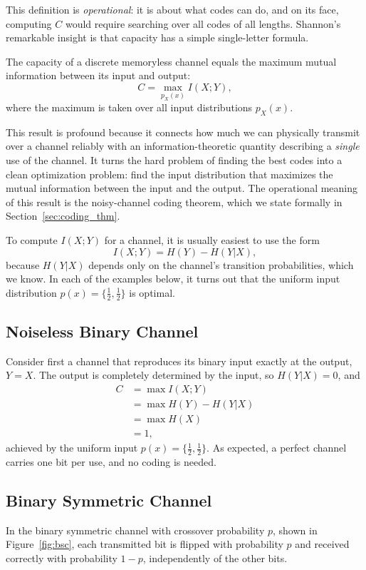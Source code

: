 This definition is \emph{operational}: it is about what codes can do, and on its face, computing \(C\) would require searching over all codes of all lengths. Shannon's remarkable insight is that capacity has a simple single-letter formula.

\begin{theorem}[Shannon]\label{thm:capacity_formula}
The capacity of a discrete memoryless channel equals the maximum mutual information between its input and output:
\[C = \max_{p_{X}(x)} I(X;Y),\]
where the maximum is taken over all input distributions \(p_X(x)\).
\end{theorem}

This result is profound because it connects how much we can physically transmit over a channel reliably with an information-theoretic quantity describing a \emph{single} use of the channel. It turns the hard problem of finding the best codes into a clean optimization problem: find the input distribution that maximizes the mutual information between the input and the output. The operational meaning of this result is the noisy-channel coding theorem, which we state formally in Section~\ref{sec:coding_thm}.

To compute \(I(X;Y)\) for a channel, it is usually easiest to use the form
\[I(X;Y) = H(Y) - H(Y|X),\]
because \(H(Y|X)\) depends only on the channel's transition probabilities, which we know. In each of the examples below, it turns out that the uniform input distribution \(p(x) = \{\frac{1}{2}, \frac{1}{2}\}\) is optimal.

\subsection{Noiseless Binary Channel}
Consider first a channel that reproduces its binary input exactly at the output, \(Y = X\). The output is completely determined by the input, so \(H(Y|X) = 0\), and
\begin{align*}
    C &= \max I(X;Y) \\
      &= \max H(Y) - H(Y|X) \\
      &= \max H(X) \\
      &= 1,
\end{align*}
achieved by the uniform input \(p(x) = \{\frac{1}{2}, \frac{1}{2}\}\). As expected, a perfect channel carries one bit per use, and no coding is needed.

\subsection{Binary Symmetric Channel}
In the binary symmetric channel with crossover probability \(p\), shown in Figure~\ref{fig:bsc}, each transmitted bit is flipped with probability \(p\) and received correctly with probability \(1-p\), independently of the other bits.

